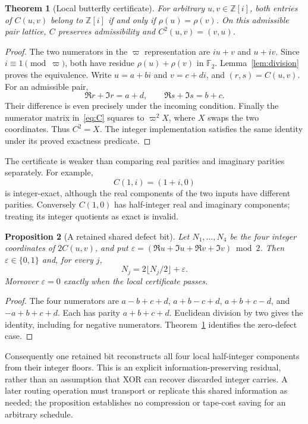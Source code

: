 \documentclass[11pt]{article}
\newtheorem{theorem}{Theorem}[section]
\newtheorem{proposition}[theorem]{Proposition}
\theoremstyle{definition}\newtheorem{definition}[theorem]{Definition}
\theoremstyle{remark}\newtheorem{remark}[theorem]{Remark}
\newcommand{\G}{\mathbb Z[i]}
\newcommand{\p}{\varpi}
\newcommand{\res}{\rho}
\begin{document}
\begin{theorem}[Local butterfly certificate]\label{thm:local}
For arbitrary $u,v\in\G$, both entries of $C(u,v)$ belong to $\G$ if and only if $\res(u)=\res(v)$. On this admissible pair lattice, $C$ preserves admissibility and $C^2(u,v)=(v,u)$.
\end{theorem}
\begin{proof}
The two numerators in the $\p$ representation are $iu+v$ and $u+iv$. Since $i\equiv1\pmod\p$, both have residue $\res(u)+\res(v)$ in $\mathbb F_2$. Lemma~\ref{lem:division} proves the equivalence. Write $u=a+bi$ and $v=c+di$, and $(r,s)=C(u,v)$. For an admissible pair,
\[
 \Re r+\Im r=a+d,\qquad \Re s+\Im s=b+c.
\]
Their difference is even precisely under the incoming condition. Finally the numerator matrix in~\eqref{eq:C} squares to $\p^2 X$, where $X$ swaps the two coordinates. Thus $C^2=X$. The integer implementation satisfies the same identity under its proved exactness predicate.
\end{proof}

The certificate is weaker than comparing real parities and imaginary parities separately. For example,
\[
 C(1,i)=(1+i,0)
\]
is integer-exact, although the real components of the two inputs have different parities. Conversely $C(1,0)$ has half-integer real and imaginary components; treating its integer quotients as exact is invalid.

\begin{proposition}[A retained shared defect bit]\label{prop:defect}
Let $N_1,\ldots,N_4$ be the four integer coordinates of $2C(u,v)$, and put
$\varepsilon=(\Re u+\Im u+\Re v+\Im v)\bmod2$. Then $\varepsilon\in\{0,1\}$ and, for every $j$,
\[
 N_j=2\lfloor N_j/2\rfloor+\varepsilon.
\]
Moreover $\varepsilon=0$ exactly when the local certificate passes.
\end{proposition}
\begin{proof}
The four numerators are $a-b+c+d$, $a+b-c+d$, $a+b+c-d$, and $-a+b+c+d$. Each has parity $a+b+c+d$. Euclidean division by two gives the identity, including for negative numerators. Theorem~\ref{thm:local} identifies the zero-defect case.
\end{proof}
Consequently one retained bit reconstructs all four local half-integer components from their integer floors. This is an explicit information-preserving residual, rather than an assumption that XOR can recover discarded integer carries. A later routing operation must transport or replicate this shared information as needed; the proposition establishes no compression or tape-cost saving for an arbitrary schedule.
\end{document}
